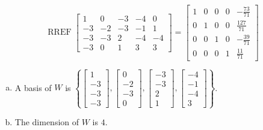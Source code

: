 \begin{exerciseAnswer} 


\[\operatorname{RREF} \left[\begin{array}{ccccc}
1 & 0 & -3 & -4 & 0 \\
-3 & -2 & -3 & -1 & 1 \\
-3 & -3 & 2 & -4 & -4 \\
-3 & 0 & 1 & 3 & 3
\end{array}\right] = \left[\begin{array}{ccccc}
1 & 0 & 0 & 0 & -\frac{73}{71} \\
0 & 1 & 0 & 0 & \frac{127}{71} \\
0 & 0 & 1 & 0 & -\frac{39}{71} \\
0 & 0 & 0 & 1 & \frac{11}{71}
\end{array}\right] \]


\begin{enumerate}[(a)]
\item A basis of \(W\) is \( \left\{ \left[\begin{array}{c}
1 \\
-3 \\
-3 \\
-3
\end{array}\right] , \left[\begin{array}{c}
0 \\
-2 \\
-3 \\
0
\end{array}\right] , \left[\begin{array}{c}
-3 \\
-3 \\
2 \\
1
\end{array}\right] , \left[\begin{array}{c}
-4 \\
-1 \\
-4 \\
3
\end{array}\right] \right\} \).
\item The dimension of \(W\) is \( 4 \).
\end{enumerate}
    
\end{exerciseAnswer}
    

